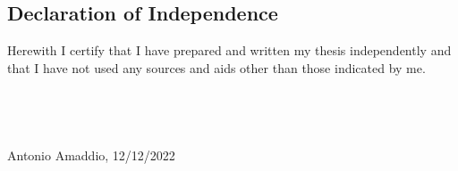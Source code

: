 \documentclass[man]{apa7}
\begin{document}
\subsection{Declaration of Independence}

Herewith I certify that I have prepared and written my thesis independently and that I have not used any sources and aids other than those indicated by me. \\
\mbox{}\\
\mbox{}\\
\mbox{}\\
\mbox{}\\
Antonio Amaddio, 12/12/2022
\end{document}
